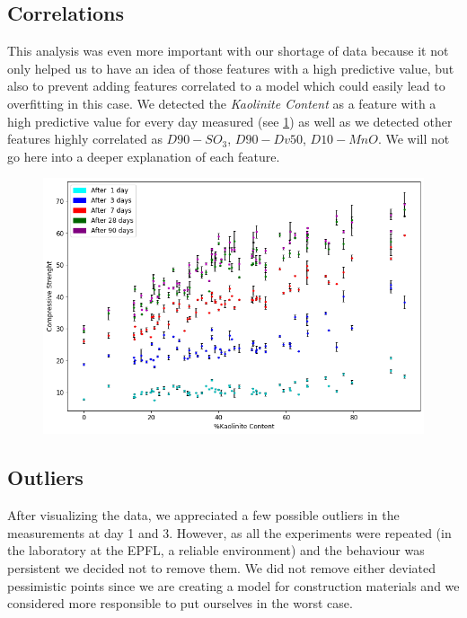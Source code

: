 \documentclass[10pt,conference,compsocconf]{IEEEtran}
\begin{document}
\subsection{Correlations}
This analysis was even more important with our shortage of data because it not only  helped us to have an idea of those features with a high predictive value, but also to prevent adding features correlated to a model which could easily lead to overfitting in this case. We detected the \textit{Kaolinite Content} as a feature with a high predictive value for every day measured (see \ref{fig:kaolinite-cs}) as well as we detected other features highly correlated as $D90-SO_3$, $D90-Dv50$, $D10-MnO$. We will not go here into a deeper explanation of each feature.


\begin{figure}[tbp]
  \centering
  \includegraphics[width=\textwidth]{figures/cstrength-std.png}
  \vspace{-3mm}
  \label{fig:kaolinite-cs}
\end{figure}

\subsection{Outliers}
After visualizing the data, we appreciated a few possible outliers in the measurements at day 1 and 3. However, as all the experiments were repeated (in the laboratory at the EPFL, a reliable environment) and the behaviour was persistent we decided not to remove them. We did not remove either deviated pessimistic points since we are creating a model for construction materials and we considered more responsible to put ourselves in the worst case.
\end{document}
